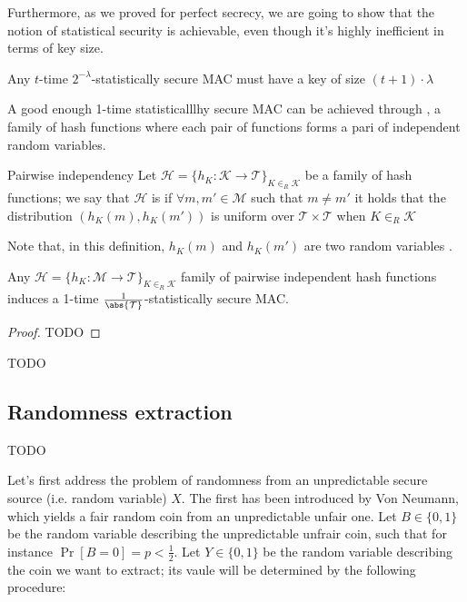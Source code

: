 \documentclass[a4paper, 12pt]{report}
\begin{document}
\begin{frameddthm}{}
Furthermore, as we proved for perfect secrecy, we are going to show that the notion of  statistical security is achievable, even though it's highly inefficient in terms of key size.

\begin{framedthm}{}
    Any $t$-time $2^{-\lambda}$-statistically secure MAC must have a key of size $(t + 1) \cdot \lambda$
\end{framedthm}

A good enough 1-time statisticalllhy secure MAC can be achieved through , a family of hash functions where each pair of functions forms a pari of independent random variables.

\begin{frameddefn}{Pairwise independency}
    Let $\mathcal H = \{h_K : \mathcal K \to \mathcal T\}_{K \in_R \mathcal K}$ be a family of hash functions; we say that $\mathcal H$ is  if $\forall m, m' \in \mathcal M$ such that $m \neq m'$ it holds that the distribution $(h_K(m), h_K(m'))$ is uniform over $\mathcal T \times \mathcal T$ when $K \in_R \mathcal K$
\end{frameddefn}

Note that, in this definition, $h_K(m)$ and $h_K(m')$ are two random variables .

\begin{framedthm}{}
    Any $\mathcal H = \{h_K : \mathcal M \to \mathcal T\}_{K \in_R \mathcal K}$ family of pairwise independent hash functions induces a 1-time $\tfrac{1}{\abs {\mathcal T}}$-statistically secure MAC.
\end{framedthm}

\begin{proof}
    TODO 
\end{proof}

TODO 

\subsection{Randomness extraction}

TODO 

Let's first address the problem of  randomness from an unpredictable secure source (i.e. random variable) $X$. The first  has been introduced by Von Neumann, which yields a fair random coin from an unpredictable unfair one. Let $B \in \{0, 1\}$ be the random variable describing the unpredictable unfrair coin, such that for instance $\Pr[B = 0] = p < \tfrac{1}{2}$. Let $Y \in \{0, 1\}$ be the random variable describing the coin we want to extract; its vaule will be determined by the following procedure:


\end{frameddthm}
\end{document}
